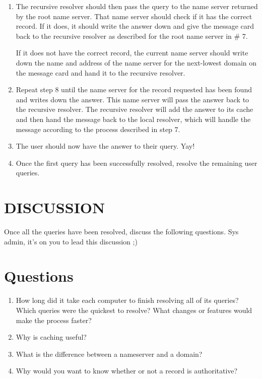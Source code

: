 \documentclass[11pt,a4paper]{article}
\begin{document}
\begin{enumerate}
\item The recursive resolver should then pass the query to the name server returned by the root name server. 
That name server should check if it has the correct record. If it does, it should write the answer down and give the message card back to the recursive resolver as described for the root name server in \# 7. 

If it does not have the correct record, the current name server should write down the name and address of the name server for the next-lowest domain on the message card and hand it to the recursive resolver.
\item Repeat step 8 until the name server for the record requested has been found and writes down the answer. 
This name server will pass the answer back to the recursive resolver.
The recursive resolver will add the answer to its cache and then hand the message back to the local resolver, which will handle the message according to the process described in step 7.  
\item The user should now have the answer to their query. Yay!
\item Once the first query has been successfully resolved, resolve the remaining user queries.

\end{enumerate}


\section{DISCUSSION}

Once all the queries have been resolved, discuss the following questions. 
Sys admin, it's on you to lead this discussion ;)
\section*{Questions}

\begin{enumerate}

\item How long did it take each computer to finish resolving all of its queries? Which queries were the quickest to resolve? What changes or features would make the process faster? 

\item Why is caching useful?

\item What is the difference between a nameserver and a domain?

\item Why would you want to know whether or not a record is authoritative?

\end{enumerate}
\end{document}
